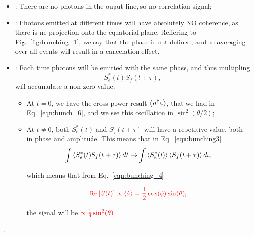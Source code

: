   \begin{itemize}
  \item {}: There are no photons in the ouput line, so no correlation signal;
  \item {}:  Photons emitted at  different times will  have absolutely NO  coherence, as
    there is no projection onto  the equatorial plane. Reffering to Fig.~\ref{fig:bunching_1},
    we say that  the phase is not defined, and  so averaging over all events will  result in a
    cancelation effect.
  \item \isuperposition{+}: Each  time photons will be  emitted with the same  phase, and thus
    multipling
    \begin{equation}\label{key}
      S_{e}^{*}(t)S_{f}(t+\tau),
    \end{equation}
    \noindent will accumulate a non zero value.
    \begin{itemize}
    \item At $ t = 0 $, we have the cross power result $ \left\langle a^{\dagger} a \right\rangle $, that we had
      in Eq.~\eqref{eqn:bunch_6}, and we see this oscillation in $ \sin^2(\theta/2) $;
    \item At $  t \neq 0$, both $ S_e^{*}(t)  $ and $ S_{f}(t+\tau) $ will  have a repetitive value,
      both in phase and amplitude. This means that in Eq.~\eqref{eqn:bunching3}
      \begin{equation}\label{}
        \int\left\langle S_{e}^{*}(t)S_{f}(t+\tau) \right\rangle dt \rightarrow \int \left\langle S_e^{*}(t) \right\rangle\left\langle S_{f}(t+\tau) \right\rangle dt,
      \end{equation}
  	
      \noindent which means that from Eq.~\eqref{eqn:bunching_4}
  	
  	\begin{equation}\label{key}
          {\color{red}{\text{Re}\left[S(t)\right] \propto \ensuremath{\left\langle \hat{a} \right\rangle} = \frac{1}{2}\cos(\phi)\sin(\theta)}},
  	\end{equation}
  	
  	\noindent the signal will be $ {\color{red}{\propto \frac{1}{4}\sin^2(\theta)}} $.
  	
      \end{itemize}
    \end{itemize}

      .
	
